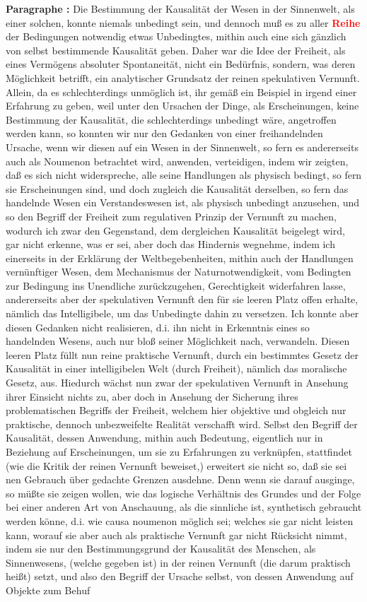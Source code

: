 \documentclass[a4paper,12pt,twoside]{book}
\newcommand{\match}[1]{\textcolor{red}{\textbf{#1}}}
\begin{document}
	\noindent\textbf{Paragraphe : }
	Die Bestimmung der Kausalität der Wesen in der Sinnenwelt, als einer solchen, konnte niemals unbedingt sein, und dennoch muß es zu aller \match{Reihe} der Bedingungen notwendig etwas Unbedingtes, mithin auch eine sich gänzlich von selbst bestimmende Kausalität geben. Daher war die Idee der Freiheit, als eines Vermögens absoluter Spontaneität, nicht ein Bedürfnis, sondern, was deren Möglichkeit betrifft, ein analytischer Grundsatz der reinen spekulativen Vernunft. Allein, da es schlechterdings unmöglich ist, ihr gemäß ein Beispiel in irgend einer Erfahrung zu geben, weil unter den Ursachen der Dinge, als Erscheinungen, keine Bestimmung der Kausalität, die schlechterdings unbedingt wäre, angetroffen werden kann, so konnten wir nur den Gedanken von einer freihandelnden Ursache, wenn wir diesen auf ein Wesen in der Sinnenwelt, so fern es andererseits auch als Noumenon betrachtet wird, anwenden, verteidigen, indem wir zeigten, daß es sich nicht widerspreche, alle seine Handlungen als physisch bedingt, so fern sie Erscheinungen sind, und doch zugleich die Kausalität derselben, so fern das handelnde Wesen ein Verstandeswesen ist, als physisch unbedingt anzusehen, und so den Begriff der Freiheit zum regulativen Prinzip der Vernunft zu machen, wodurch ich zwar den Gegenstand, dem dergleichen Kausalität beigelegt wird, gar nicht erkenne, was er sei, aber doch das Hindernis wegnehme, indem ich einerseits in der Erklärung der Weltbegebenheiten, mithin auch der Handlungen vernünftiger Wesen, dem Mechanismus der Naturnotwendigkeit, vom Bedingten zur Bedingung ins Unendliche zurückzugehen, Gerechtigkeit widerfahren lasse, andererseits aber der spekulativen Vernunft den für sie leeren Platz offen erhalte, nämlich das Intelligibele, um das Unbedingte dahin zu versetzen. Ich konnte aber diesen Gedanken nicht realisieren, d.i. ihn nicht in Erkenntnis eines so handelnden Wesens, auch nur bloß seiner Möglichkeit nach, verwandeln. Diesen leeren Platz füllt nun reine praktische Vernunft, durch ein bestimmtes Gesetz der Kausalität in einer intelligibelen Welt (durch Freiheit), nämlich das moralische Gesetz, aus. Hiedurch wächst nun zwar der  spekulativen Vernunft in Ansehung ihrer Einsicht nichts zu, aber doch in Ansehung der Sicherung ihres problematischen Begriffs der Freiheit, welchem hier objektive und obgleich nur praktische, dennoch unbezweifelte Realität verschafft wird. Selbst den Begriff der Kausalität, dessen Anwendung, mithin auch Bedeutung, eigentlich nur in Beziehung auf Erscheinungen, um sie zu Erfahrungen zu verknüpfen, stattfindet (wie die Kritik der reinen Vernunft beweiset,) erweitert sie nicht so, daß sie sei nen Gebrauch über gedachte Grenzen ausdehne. Denn wenn sie darauf ausginge, so müßte sie zeigen wollen, wie das logische Verhältnis des Grundes und der Folge bei einer anderen Art von Anschauung, als die sinnliche ist, synthetisch gebraucht werden könne, d.i. wie causa noumenon möglich sei; welches sie gar nicht leisten kann, worauf sie aber auch als praktische Vernunft gar nicht Rücksicht nimmt, indem sie nur den Bestimmungsgrund der Kausalität des Menschen, als Sinnenwesens, (welche gegeben ist) in der reinen Vernunft (die darum praktisch heißt) setzt, und also den Begriff der Ursache selbst, von dessen Anwendung auf Objekte zum Behuf 
\end{document}
